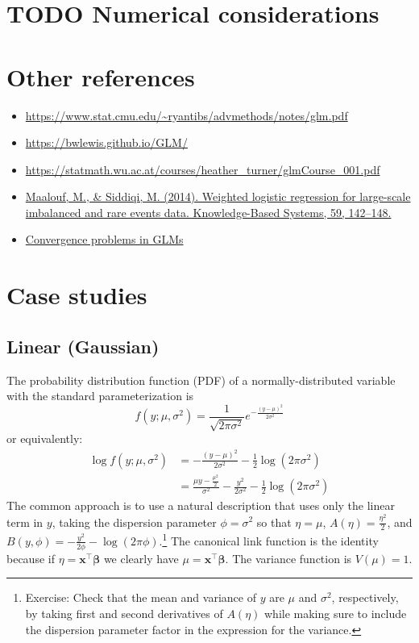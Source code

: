 \documentclass{article}
\newcommand{\bbeta}{\boldsymbol{\beta}}
\begin{document}
\section{TODO Numerical considerations}

\section{Other references}

\begin{itemize}
\item \url{https://www.stat.cmu.edu/~ryantibs/advmethods/notes/glm.pdf}
\item \url{https://bwlewis.github.io/GLM/}
\item \url{https://statmath.wu.ac.at/courses/heather_turner/glmCourse_001.pdf}
\item \href{https://doi.org/10.1016/j.knosys.2014.01.012}{Maalouf, M., \& Siddiqi, M. (2014). Weighted logistic regression for large-scale imbalanced and rare events data. Knowledge-Based Systems, 59, 142–148.}
\item \href{https://journal.r-project.org/archive/2011-2/RJournal_2011-2_Marschner.pdf}{Convergence problems in GLMs}
\end{itemize}

\section{Case studies}

\subsection{Linear (Gaussian)}

The probability distribution function (PDF) of a normally-distributed variable
with the standard parameterization is
\[ f(y; \mu, \sigma^2) = \frac{1}{\sqrt{2\pi\sigma^2}} e^{-\frac{(y - \mu)^2}{2\sigma^2}} \]
or equivalently:
\begin{align}
\log f(y; \mu, \sigma^2) &= -\frac{(y-\mu)^2}{2\sigma^2} - \frac{1}{2} \log (2\pi\sigma^2) \\\
&= \frac{\mu y - \frac{\mu^2}{2}}{\sigma^2} - \frac{y^2}{2\sigma^2} -
\frac{1}{2} \log (2\pi\sigma^2)
\end{align}
The common approach is to use a natural description that uses only the linear
term in \(y\), taking the dispersion parameter \(\phi = \sigma^2\) so that
\(\eta = \mu\), \(A(\eta) = \frac{\eta^2}{2}\), and \(B(y, \phi) =
-\frac{y^2}{2\phi} - \log(2\pi\phi) \).\footnote{
    Exercise: Check that the mean and variance of \(y\) are \(\mu\) and
    \(\sigma^2\), respectively, by taking first and second derivatives of
    \(A(\eta)\) while making sure to include the dispersion parameter factor
    in the expression for the variance.
}
The canonical link function is the identity because if \(\eta =
\mathbf{x}^\intercal\bbeta\) we clearly have \(\mu =
\mathbf{x}^\intercal \bbeta\).
The variance function is \(V(\mu) = 1\).
\end{document}
